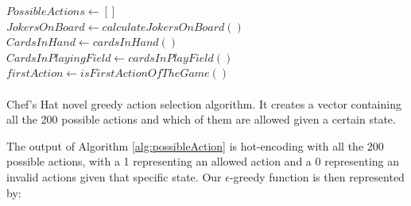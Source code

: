 \documentclass[a4paper,conference]{IEEEtran}
\begin{document}
\begin{algorithm}
 
 \State $PossibleActions\gets []$\\
 \State $JokersOnBoard\gets calculateJokersOnBoard()$\\
 \State $CardsInHand\gets cardsInHand()$\\
  \State $CardsInPlayingField\gets cardsInPlayField()$\\
  
  \State $firstAction \gets isFirstActionOfTheGame()$ \\
  
    \\
 
 \caption{Chef's Hat novel greedy action selection algorithm. It creates a vector containing all the 200 possible actions and which of them are allowed given a certain state.}
 \label{alg:possibleAction}
\end{algorithm}


The output of Algorithm \ref{alg:possibleAction} is hot-encoding with all the 200 possible actions, with a 1 representing an allowed action and a 0 representing an invalid actions given that specific state. Our $\epsilon$-greedy function is then represented by:
\end{document}
